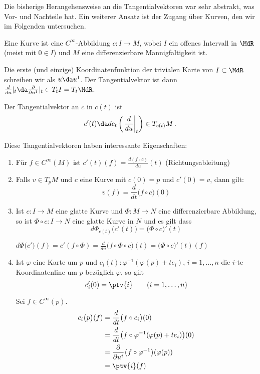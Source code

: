 \documentclass[a4paper,twoside,DIV15,BCOR12mm]{scrbook}
\begin{document}
Die bisherige Herangehensweise an die Tangentialvektoren war sehr abstrakt, was Vor- und Nachteile hat. Ein weiterer Ansatz ist der Zugang über Kurven, den wir im Folgenden untersuchen.

Eine Kurve ist eine $C^\infty$-Abbildung $c:I\to M$, wobei $I$ ein offenes Intervall in $\MdR$ (meist mit $0\in I$) und $M$ eine differenzierbare Mannigfaltigkeit ist.

Die erste (und einzige) Koordinatenfunktion der trivialen Karte von $I\subset\MdR$ schreiben wir als $u\da u^1$. Der Tangentialvektor ist dann $\frac{d}{d u}|_t \da\frac{\partial}{\partial u^1}|_t \in T_tI = T_t\MdR$.

\begin{definition}
Der Tangentialvektor an $c$ in $c(t)$ ist
\[
c'(t) \da dc_t \left(\left. \frac d{du}\right|_t\right) \in T_{c(t)}M\,.
\]
\end{definition}

Diese Tangentialvektoren haben interessante Eigenschaften:
\begin{enumerate}
\item Für $f\in C^\infty(M)$ ist $c'(t)(f) = \frac{d(f\circ c)}{du}(t)$ (Richtungsableitung)
\item Falls $v\in T_pM$ und $c$ eine Kurve mit $c(0)=p$ und $c'(0) = v$, dann gilt:
\[
v(f) = \frac{d}{dt}\big(f\circ c\big) (0)
\]
\item Ist $c:I\to M$ eine glatte Kurve und $\Phi:M\to N$ eine differenzierbare Abbildung, so ist $\Phi \circ c: I \to N$ eine glatte Kurve in $N$ und es gilt dass
\[
d\Phi_{c(t)}\big(c'(t)\big) = \big(\Phi \circ c\big)'(t)
\]
\begin{beweis}
$d\Phi\big(c'\big)(f) = c'(f\circ \Phi) = \frac{d}{du}\big(f\circ \Phi \circ c\big) (t) 
= \big(\Phi \circ c\big)'(t)(f)$
\end{beweis}
\item Ist $\varphi$ eine Karte um $p$ und $c_i(t):\varphi^{-1}(\varphi(p) + te_i)$, $i=1,\ldots,n$ die $i$-te Koordinatenline um $p$ bezüglich $\varphi$, so gilt
\[
c_i'(0) = \ptv{i} \qquad (i=1,\ldots,n)
\]
\begin{beweis}
Sei $f\in C^\infty(p)$.
\begin{align*}c_i\big(p\big) (f) &= \frac d{dt}\big(f\circ c_i\big)(0)  \\
&= \frac d{dt} \big(f\circ \varphi^{-1}(\varphi(p) + te_i)\big)(0) \\
&= \frac{\partial}{\partial u^i}\big(f\circ \varphi^{-1}\big)(\varphi(p))\\
&= \ptv{i}(f)
\end{align*}
\end{beweis}
\end{enumerate}
\end{document}
